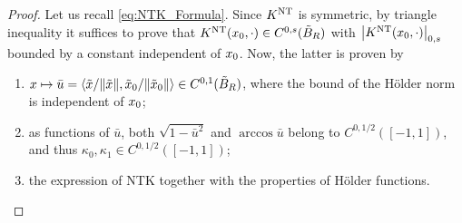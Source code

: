 \begin{proof}
  Let us recall \cref{eq:NTK_Formula}.
  Since $K^{\mathrm{NT}}$ is symmetric, by triangle inequality it suffices to prove that $K^{\mathrm{NT}}(x_0,\cdot) \in C^{0,s}(\tilde{B}_R)$
  with $\abs{K^{\mathrm{NT}}(x_0,\cdot)}_{0,s}$ bounded by a constant independent of $x_0$.
  Now, the latter is proven by
  \begin{enumerate}[$(a)$~]
    \item $x \mapsto \bar{u} = \left\langle{{\tilde{x}}/{\norm{\tilde{x}}}, {\tilde{x}_0}/{\norm{\tilde{x}_0}}}\right\rangle \in C^{0,1}(\tilde{B}_R)$, where the bound of the Hölder
    norm is independent of $x_0$;
    \item as functions of $\bar{u}$, both $\sqrt{1 - \bar{u}^2}$ and $\arccos \bar{u}$ belong to $C^{0,{1}/{2}}([-1,1])$, and thus
    $\kappa_0,\kappa_1 \in C^{0,{1}/{2}}([-1,1])$;
    \item the expression of NTK together with the properties of Hölder functions.
  \end{enumerate}
\end{proof}


